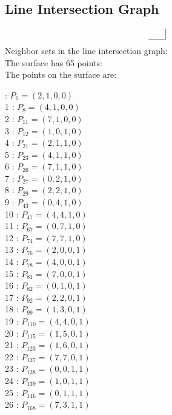 \documentclass{article}
\begin{document}
{\subsection*{Line Intersection Graph}
{\arraycolsep=1pt
$$
\begin{array}{rr|*{0}r}
 & \\
\hline
\end{array}
$$
}%
Neighbor sets in the line intersection graph:\\
The surface has 65 points:\\
The points on the surface are:\\
\begin{multicols}{3}
 : $P_{6}=( 2, 1, 0, 0 )$\\
1 : $P_{8}=( 4, 1, 0, 0 )$\\
2 : $P_{11}=( 7, 1, 0, 0 )$\\
3 : $P_{12}=( 1, 0, 1, 0 )$\\
4 : $P_{21}=( 2, 1, 1, 0 )$\\
5 : $P_{23}=( 4, 1, 1, 0 )$\\
6 : $P_{26}=( 7, 1, 1, 0 )$\\
7 : $P_{27}=( 0, 2, 1, 0 )$\\
8 : $P_{29}=( 2, 2, 1, 0 )$\\
9 : $P_{43}=( 0, 4, 1, 0 )$\\
10 : $P_{47}=( 4, 4, 1, 0 )$\\
11 : $P_{67}=( 0, 7, 1, 0 )$\\
12 : $P_{74}=( 7, 7, 1, 0 )$\\
13 : $P_{76}=( 2, 0, 0, 1 )$\\
14 : $P_{78}=( 4, 0, 0, 1 )$\\
15 : $P_{81}=( 7, 0, 0, 1 )$\\
16 : $P_{82}=( 0, 1, 0, 1 )$\\
17 : $P_{92}=( 2, 2, 0, 1 )$\\
18 : $P_{99}=( 1, 3, 0, 1 )$\\
19 : $P_{110}=( 4, 4, 0, 1 )$\\
20 : $P_{115}=( 1, 5, 0, 1 )$\\
21 : $P_{123}=( 1, 6, 0, 1 )$\\
22 : $P_{137}=( 7, 7, 0, 1 )$\\
23 : $P_{138}=( 0, 0, 1, 1 )$\\
24 : $P_{139}=( 1, 0, 1, 1 )$\\
25 : $P_{146}=( 0, 1, 1, 1 )$\\
26 : $P_{168}=( 7, 3, 1, 1 )$\\

\end{multicols}}
\end{document}
